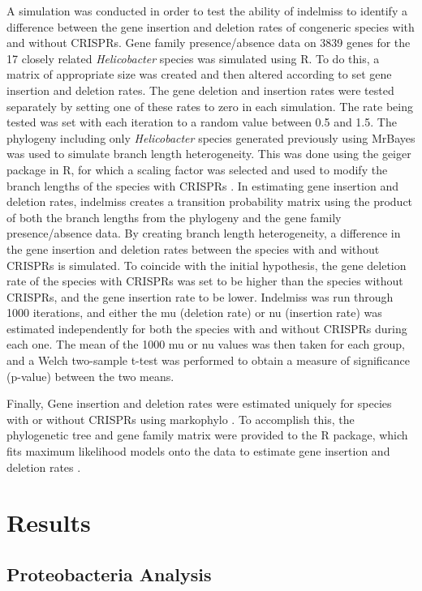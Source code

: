 \documentclass[english]{article}
\begin{document}
A simulation was conducted in order to test the ability of indelmiss
to identify a difference between the gene insertion and deletion rates of
congeneric species with and without CRISPRs.  Gene family
presence/absence data on 3839 genes for the 17 closely related
\textit{Helicobacter} species was simulated using R. 
To do this, a matrix of appropriate size was
created and then altered according to set gene insertion and deletion
rates.  The gene deletion and insertion rates were tested separately
by setting one of these rates to zero in each simulation. The rate being
tested was set with each iteration to a random value 
between 0.5 and 1.5. The phylogeny including only 
\textit{Helicobacter} species generated previously using MrBayes was
used to simulate branch length heterogeneity. This was done using the
geiger package in R, for which a scaling factor was selected and used
to modify the branch lengths of the 
species with CRISPRs \citep{Harmon09}. In
estimating gene insertion and deletion rates, indelmiss creates a
transition probability matrix using the product of both the branch
lengths from the phylogeny and the gene family presence/absence data.
By creating branch length heterogeneity, a difference in the gene
insertion and deletion rates between the species with and without
CRISPRs is simulated. To coincide with the initial hypothesis, the
gene deletion rate of the species with CRISPRs was set to be higher
than the species without CRISPRs, and the gene insertion rate to be
lower.  Indelmiss was run through 1000 iterations, and either the mu
(deletion rate) or nu (insertion rate) was estimated independently 
for both the
species with and without CRISPRs during each one. The mean of the
1000 mu or nu values was then taken for each group, and a Welch
two-sample t-test was performed to obtain a measure of significance
(p-value) between the two means. 

Finally, Gene insertion and deletion rates were estimated uniquely for species
with or without CRISPRs using markophylo \citep{Dang2:15}. To accomplish this, the
phylogenetic tree and gene family matrix were provided to
the R package, which fits maximum likelihood models onto the data to estimate
gene insertion and deletion rates \citep{Dang2:15}. 

\section{Results}
\thefontsize\large
\onehalfspacing
\subsection{Proteobacteria Analysis}
\end{document}
